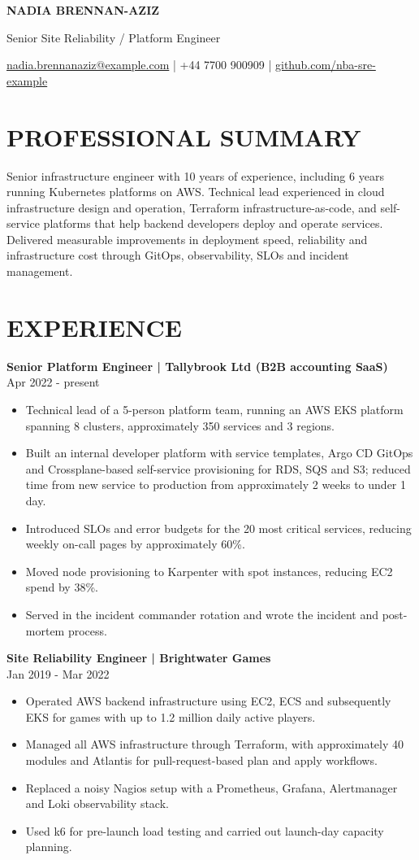 \documentclass[11pt,a4paper]{article}
\newcommand{\cvsection}[1]{\section*{#1}}
\newcommand{\cvrole}[2]{\needspace{5\baselineskip}\noindent\textbf{#1}\\#2\par}
\begin{document}
{\LARGE\bfseries\color{primarycolor} NADIA BRENNAN-AZIZ}\par
{\large\color{accentcolor} Senior Site Reliability / Platform Engineer}\par
{\small \href{mailto:nadia.brennanaziz@example.com}{nadia.brennanaziz@example.com} | +44 7700 900909 | \href{https://github.com/nba-sre-example}{github.com/nba-sre-example}}\par
\cvsection{PROFESSIONAL SUMMARY}
Senior infrastructure engineer with 10 years of experience, including 6 years running Kubernetes platforms on AWS. Technical lead experienced in cloud infrastructure design and operation, Terraform infrastructure-as-code, and self-service platforms that help backend developers deploy and operate services. Delivered measurable improvements in deployment speed, reliability and infrastructure cost through GitOps, observability, SLOs and incident management.
\cvsection{EXPERIENCE}
\cvrole{Senior Platform Engineer | Tallybrook Ltd (B2B accounting SaaS)}{Apr 2022 - present}
\begin{itemize}
\item Technical lead of a 5-person platform team, running an AWS EKS platform spanning 8 clusters, approximately 350 services and 3 regions.
\item Built an internal developer platform with service templates, Argo CD GitOps and Crossplane-based self-service provisioning for RDS, SQS and S3; reduced time from new service to production from approximately 2 weeks to under 1 day.
\item Introduced SLOs and error budgets for the 20 most critical services, reducing weekly on-call pages by approximately 60\%.
\item Moved node provisioning to Karpenter with spot instances, reducing EC2 spend by 38\%.
\item Served in the incident commander rotation and wrote the incident and post-mortem process.
\end{itemize}
\cvrole{Site Reliability Engineer | Brightwater Games}{Jan 2019 - Mar 2022}
\begin{itemize}
\item Operated AWS backend infrastructure using EC2, ECS and subsequently EKS for games with up to 1.2 million daily active players.
\item Managed all AWS infrastructure through Terraform, with approximately 40 modules and Atlantis for pull-request-based plan and apply workflows.
\item Replaced a noisy Nagios setup with a Prometheus, Grafana, Alertmanager and Loki observability stack.
\item Used k6 for pre-launch load testing and carried out launch-day capacity planning.
\end{itemize}
\end{document}
